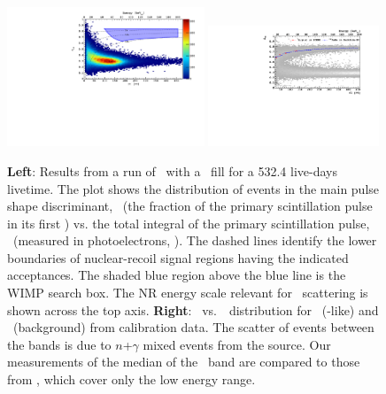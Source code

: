 \begin{figure}[!t]
\begin{center}
\includegraphics[width=0.525\textwidth]{./Figures/DSfHighMassSearch.pdf}
\includegraphics[width=0.455\textwidth]{./Figures/DSf-UArAmBeDMSStCut.pdf}
\end{center}
\caption{{\bf Left}: Results from a run of \DSf\ with a \UAr\ fill for a 532.4 live-days livetime.  The plot shows the distribution of events in the main pulse shape discriminant, \FNine\ (the fraction of the primary scintillation pulse in its first \WindowFNine) vs. the total integral of the primary scintillation pulse, \SOne\ (measured in photoelectrons, \si{\pe}).  The dashed lines identify the lower boundaries of nuclear-recoil signal regions having the indicated acceptances.   The shaded blue region above the blue line is the WIMP search box.  The NR energy scale relevant for \WIMP\ scattering is shown across the top axis.  {\bf Right}: \FNine\ vs.~\SOne\ distribution for \NRs\ (\WIMP-like) and \ERs\ (background) from  calibration data.  The scatter of events between the bands is due to $n$+$\gamma$ mixed events from the source.  Our measurements of the median of the \NR\ band are compared to those from \SCENE, which cover only the low energy range.}
\label{fig:DSf-UArResults}	
\end{figure}

